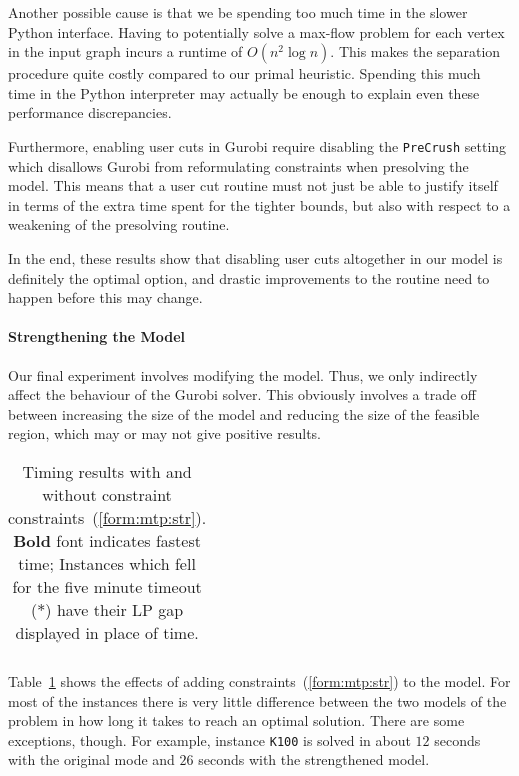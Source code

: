 Another possible cause is that we be spending too much time in the slower Python
interface. Having to potentially
solve a max-flow problem for each vertex in the input graph incurs a runtime
of $O(n^2 \log n)$. This makes the separation procedure quite costly compared
to our primal heuristic.
Spending this much time in the Python interpreter may actually be enough to explain
even these performance
discrepancies.

Furthermore, enabling user cuts in Gurobi require disabling the \texttt{PreCrush} setting
which disallows Gurobi from reformulating constraints when presolving the model. This means
that a user cut routine must not just be able to justify
itself in terms of the extra time spent for the tighter bounds,
but also with respect to a weakening of the presolving routine.

In the end, these results show that disabling user cuts altogether in our model is definitely
the optimal option, and drastic improvements to the routine need to happen before this may
change.

\paragraph{Strengthening the Model}
Our final experiment involves modifying the model. Thus, we only indirectly affect the
behaviour of the Gurobi solver.
This obviously involves a trade off between increasing the size of the model and reducing the size
of the feasible region, which may or may not give positive results.

\begin{table}[h!]
  \centering
  \begin{tabular}[h!]{|c|c|c|c|}\hline
    
  \end{tabular}
  \caption{Timing results with and without constraint constraints~(\ref{form:mtp:str}).
    \textbf{Bold} font indicates fastest time; Instances which fell for the five minute
  timeout ($*$) have their LP gap displayed in place of time.} 
  \label{tab:jmp:strengthen}
\end{table}

Table~\ref{tab:jmp:strengthen} shows the effects of adding constraints~(\ref{form:mtp:str}) to
the model. For most of the instances there is very little difference between the two models
of the problem in how long it takes to reach an optimal solution. There are some exceptions, though.
For example, instance \texttt{K100} is solved in about $12$ seconds with the original mode and
$26$ seconds with the strengthened model.

